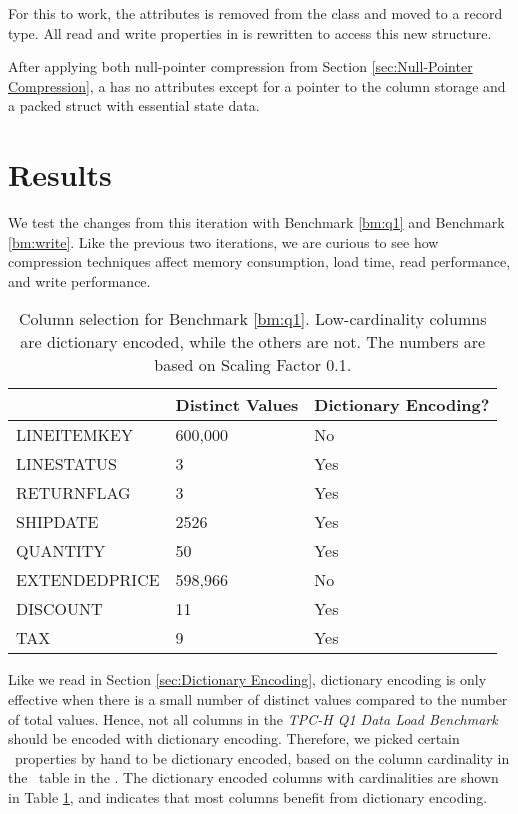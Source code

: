 For this to work, the attributes is removed from the  class and moved to a  record type. All read and write properties in  is rewritten to access this new structure.

After applying both null-pointer compression from Section \ref{sec:Null-Pointer Compression}, a  has no attributes except for a pointer to the column storage and a packed struct with essential state data. 

\section{Results}
\label{sec:Results}
We test the changes from this iteration with Benchmark \ref{bm:q1} and Benchmark \ref{bm:write}. Like the previous two iterations, we are curious to see how compression techniques affect memory consumption, load time, read performance, and write performance. 

\begin{table}
    \begin{tabularx}{\textwidth}{X | X X}
        & Distinct Values & Dictionary Encoding? \\ 
        \hline
        \hline
        LINEITEMKEY & 600,000 & No \\
        LINESTATUS & 3 & Yes \\
        RETURNFLAG & 3 & Yes \\
        SHIPDATE & 2526 & Yes \\
        QUANTITY & 50 & Yes \\
        EXTENDEDPRICE & 598,966 & No \\
        DISCOUNT & 11 & Yes \\
        TAX & 9 & Yes
    \end{tabularx}
    \caption{Column selection for Benchmark \ref{bm:q1}. Low-cardinality columns are dictionary encoded, while the others are not. The numbers are based on Scaling Factor 0.1.}
    \label{tab:column-selection}
\end{table}

Like we read in Section \ref{sec:Dictionary Encoding}, dictionary encoding is only effective when there is a small number of distinct values compared to the number of total values. Hence, not all columns in the \textit{TPC-H Q1 Data Load Benchmark} should be encoded with dictionary encoding. Therefore, we picked certain \lineitem~properties by hand to be dictionary encoded, based on the column cardinality in the \lineitem~table in the \tpch. The dictionary encoded columns with cardinalities are shown in Table \ref{tab:column-selection}, and indicates that most columns benefit from dictionary encoding.

